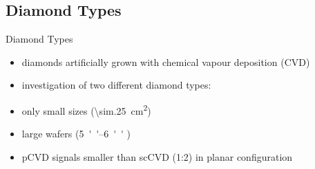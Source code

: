 \subsection{Diamond Types}
\begin{frame}{Diamond Types}

	\begin{itemize}\itemfill
		\item diamonds artificially grown with chemical vapour deposition (CVD)
		\item investigation of two different diamond types:
	\end{itemize}
	
	
	\hspace*{10pt}
	\begin{minipage}{6cm}
		\begin{itemize}
			\item only small sizes (\SI{\sim.25}{cm^2})
		\end{itemize}
	\end{minipage}
	\hspace*{2pt}
	\begin{minipage}{5cm}
		\begin{itemize}
			\item large wafers (\SIrange{5}{6}{''} \diameter)
		\end{itemize}
	\end{minipage}\vspace*{5pt}
	
	\begin{itemize}
		\item pCVD signals smaller than scCVD (1:2) in planar configuration
	\end{itemize}

	
\end{frame}

